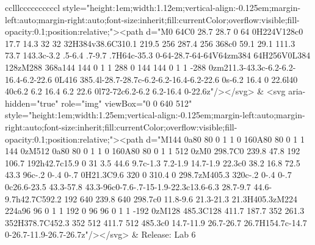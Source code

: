 \documentclass[
]{article}
\begin{document}
\begin{figure*}
\begin{longtable*}{cclllccccccccccl}
style="height:1em;width:1.12em;vertical-align:-0.125em;margin-left:auto;margin-right:auto;font-size:inherit;fill:currentColor;overflow:visible;fill-opacity:0.1;position:relative;"><path d="M0 64C0 28.7 28.7 0 64 0H224V128c0 17.7 14.3 32 32 32H384v38.6C310.1 219.5 256 287.4 256 368c0 59.1 29.1 111.3 73.7 143.3c-3.2 .5-6.4 .7-9.7 .7H64c-35.3 0-64-28.7-64-64V64zm384 64H256V0L384 128zM288 368a144 144 0 1 1 288 0 144 144 0 1 1 -288 0zm211.3-43.3c-6.2-6.2-16.4-6.2-22.6 0L416 385.4l-28.7-28.7c-6.2-6.2-16.4-6.2-22.6 0s-6.2 16.4 0 22.6l40 40c6.2 6.2 16.4 6.2 22.6 0l72-72c6.2-6.2 6.2-16.4 0-22.6z"/></svg> & <svg aria-hidden="true" role="img" viewBox="0 0 640 512" style="height:1em;width:1.25em;vertical-align:-0.125em;margin-left:auto;margin-right:auto;font-size:inherit;fill:currentColor;overflow:visible;fill-opacity:0.1;position:relative;"><path d="M144 0a80 80 0 1 1 0 160A80 80 0 1 1 144 0zM512 0a80 80 0 1 1 0 160A80 80 0 1 1 512 0zM0 298.7C0 239.8 47.8 192 106.7 192h42.7c15.9 0 31 3.5 44.6 9.7c-1.3 7.2-1.9 14.7-1.9 22.3c0 38.2 16.8 72.5 43.3 96c-.2 0-.4 0-.7 0H21.3C9.6 320 0 310.4 0 298.7zM405.3 320c-.2 0-.4 0-.7 0c26.6-23.5 43.3-57.8 43.3-96c0-7.6-.7-15-1.9-22.3c13.6-6.3 28.7-9.7 44.6-9.7h42.7C592.2 192 640 239.8 640 298.7c0 11.8-9.6 21.3-21.3 21.3H405.3zM224 224a96 96 0 1 1 192 0 96 96 0 1 1 -192 0zM128 485.3C128 411.7 187.7 352 261.3 352H378.7C452.3 352 512 411.7 512 485.3c0 14.7-11.9 26.7-26.7 26.7H154.7c-14.7 0-26.7-11.9-26.7-26.7z"/></svg> & Release: Lab 6 \\ 

\end{longtable*}
\end{figure*}
\end{document}
